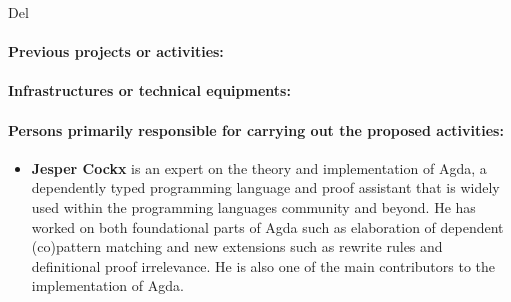 \begin{sitedescription}{Del}

\paragraph{Previous projects or activities:}

\paragraph{Infrastructures or technical equipments:}

\paragraph{Persons primarily responsible for carrying out the proposed activities:}

\begin{itemize}

  \item{\bf Jesper Cockx} is an expert on the theory and
  implementation of Agda, a dependently typed programming language and
  proof assistant that is widely used within the programming languages
  community and beyond. He has worked on both foundational parts of
  Agda such as elaboration of dependent (co)pattern matching and new
  extensions such as rewrite rules and definitional proof
  irrelevance. He is also one of the main contributors to the
  implementation of Agda.

\end{itemize}




\end{sitedescription}

